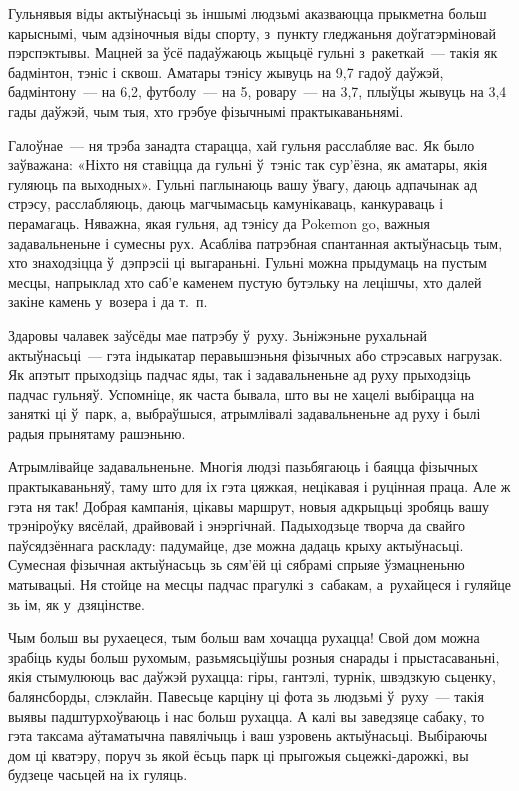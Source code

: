 Гульнявыя віды актыўнасьці зь іншымі людзьмі аказваюцца прыкметна больш карыснымі, чым адзіночныя віды спорту, з~пункту гледжаньня доўгатэрміновай пэрспэктывы. Мацней за ўсё падаўжаюць жыцьцё гульні з~ракеткай~--- такія як бадмінтон, тэніс і сквош. Аматары тэнісу жывуць на 9,7 гадоў даўжэй, бадмінтону~--- на 6,2, футболу~--- на 5, ровару~--- на 3,7, плыўцы жывуць на 3,4 гады даўжэй, чым тыя, хто грэбуе фізычнымі практыкаваньнямі.

Галоўнае~--- ня трэба занадта старацца, хай гульня расслабляе вас. Як было заўважана: «Ніхто ня ставіцца да гульні ў~тэніс так сур'ёзна, як аматары, якія гуляюць па выходных». Гульні паглынаюць вашу ўвагу, даюць адпачынак ад стрэсу, расслабляюць, даюць магчымасьць камунікаваць, канкураваць і перамагаць. Няважна, якая гульня, ад тэнісу да Pokemon go, важныя задавальненьне і сумесны рух. Асабліва патрэбная спантанная актыўнасьць тым, хто знаходзіцца ў~дэпрэсіі ці выгараньні. Гульні можна прыдумаць на пустым месцы, напрыклад хто саб'е каменем пустую бутэльку на лецішчы, хто далей закіне камень у~возера і да т.~п.

Здаровы чалавек заўсёды мае патрэбу ў~руху. Зьніжэньне рухальнай актыўнасьці~--- гэта індыкатар перавышэньня фізычных або стрэсавых нагрузак. Як апэтыт прыходзіць падчас яды, так і задавальненьне ад руху прыходзіць падчас гульняў. Успомніце, як часта бывала, што вы не хацелі выбірацца на заняткі ці ў~парк, а, выбраўшыся, атрымлівалі задавальненьне ад руху і былі радыя прынятаму рашэньню.

Атрымлівайце задавальненьне. Многія людзі пазьбягаюць і баяцца фізычных практыкаваньняў, таму што для іх гэта цяжкая, нецікавая і руцінная праца. Але ж гэта ня так! Добрая кампанія, цікавы маршрут, новыя адкрыцьці зробяць вашу трэніроўку вясёлай, драйвовай і энэргічнай. Падыходзьце творча да свайго паўсядзённага раскладу: падумайце, дзе можна дадаць крыху актыўнасьці. Сумесная фізычная актыўнасьць зь сям'ёй ці сябрамі спрыяе ўзмацненьню матывацыі. Ня стойце на месцы падчас прагулкі з~сабакам, а~рухайцеся і гуляйце зь ім, як у~дзяцінстве.

Чым больш вы рухаецеся, тым больш вам хочацца рухацца! Свой дом можна зрабіць куды больш рухомым, разьмясьціўшы розныя снарады і прыстасаваньні, якія стымулююць вас даўжэй рухацца: гіры, гантэлі, турнік, швэдзкую сьценку, балянсборды, слэклайн. Павесьце карціну ці фота зь людзьмі ў~руху~--- такія выявы падштурхоўваюць і нас больш рухацца. А калі вы заведзяце сабаку, то гэта таксама аўтаматычна павялічыць і ваш узровень актыўнасьці. Выбіраючы дом ці кватэру, поруч зь якой ёсьць парк ці прыгожыя сьцежкі-дарожкі, вы будзеце часьцей на іх гуляць.

